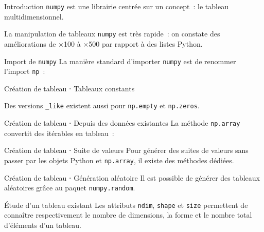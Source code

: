 \begin{frame}{Introduction}
  \texttt{numpy} est une librairie centrée sur un concept~: le tableau multidimensionnel.

  La manipulation de tableaux \texttt{numpy} est très rapide~: on constate des améliorations de ×100 à ×500 par rapport à des listes Python.
\end{frame}

\begin{frame}{Import de \texttt{numpy}}
  La manière standard d'importer \texttt{numpy} est de renommer l'import \texttt{np}~:

\end{frame}

\begin{frame}{Création de tableau ⋅ Tableaux constants}

  Des versions \texttt{\_like} existent aussi pour \texttt{np.empty} et \texttt{np.zeros}.
\end{frame}

\begin{frame}{Création de tableau ⋅ Depuis des données existantes}
  La méthode \texttt{np.array} convertit des itérables en tableau~:

\end{frame}

\begin{frame}{Création de tableau ⋅ Suite de valeurs}
  Pour générer des suites de valeurs sans passer par les objets Python et \texttt{np.array}, il existe des méthodes dédiées.
\end{frame}

\begin{frame}{Création de tableau ⋅ Génération aléatoire}
  Il est possible de générer des tableaux aléatoires grâce au paquet \texttt{numpy.random}.
\end{frame}

\begin{frame}{Étude d'un tableau existant}
  Les attributs \texttt{ndim}, \texttt{shape} et \texttt{size} permettent de connaître respectivement le nombre de dimensions, la forme et le nombre total d'éléments d'un tableau.
\end{frame}

